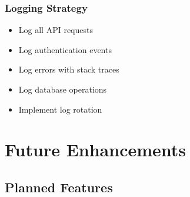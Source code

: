 \documentclass{scrreprt}
\begin{document}
\subsection{Logging Strategy}
\begin{itemize}
\item Log all API requests
\item Log authentication events
\item Log errors with stack traces
\item Log database operations
\item Implement log rotation
\end{itemize}


\chapter{Future Enhancements}

\section{Planned Features}
\end{document}
